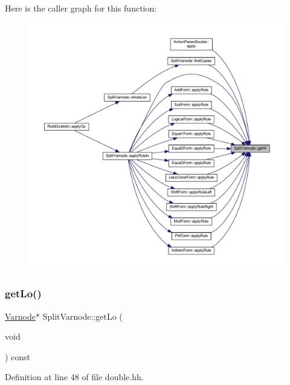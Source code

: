 Here is the caller graph for this function\+:
\nopagebreak
\begin{figure}[H]
\begin{center}
\leavevmode
\includegraphics[width=350pt]{class_split_varnode_ac42eae2b9f25ba620f3741661b91f5d6_icgraph}
\end{center}
\end{figure}
\mbox{\label{class_split_varnode_abed66f1e261a68d2d138f811eb2d2ba0}} 
\subsubsection{\texorpdfstring{getLo()}{getLo()}}
{\footnotesize\ttfamily \mbox{\hyperlink{class_varnode}{Varnode}}$\ast$ Split\+Varnode\+::get\+Lo (\begin{DoxyParamCaption}\item[{void}]{ }\end{DoxyParamCaption}) const\hspace{0.3cm}{\ttfamily [inline]}}



Definition at line 48 of file double.\+hh.


